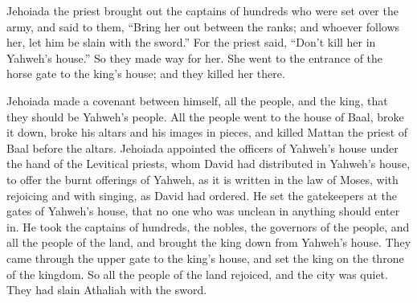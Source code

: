 {\par }{\PP {}Jehoiada the priest brought out the captains of hundreds who were set over the army, and said to them, “Bring her out between the ranks; and whoever follows her, let him be slain with the sword.” For the priest said, “Don’t kill her in Yahweh’s house.”
So they made way for her. She went to the entrance of the horse gate to the king’s house; and they killed her there.
\par }{\PP {}Jehoiada made a covenant between himself, all the people, and the king, that they should be Yahweh’s people.
All the people went to the house of Baal, broke it down, broke his altars and his images in pieces, and killed Mattan the priest of Baal before the altars.
Jehoiada appointed the officers of Yahweh’s house under the hand of the Levitical priests, whom David had distributed in Yahweh’s house, to offer the burnt offerings of Yahweh, as it is written in the law of Moses, with rejoicing and with singing, as David had ordered.
He set the gatekeepers at the gates of Yahweh’s house, that no one who was unclean in anything should enter in.
He took the captains of hundreds, the nobles, the governors of the people, and all the people of the land, and brought the king down from Yahweh’s house. They came through the upper gate to the king’s house, and set the king on the throne of the kingdom.
So all the people of the land rejoiced, and the city was quiet. They had slain Athaliah with the sword.

}
